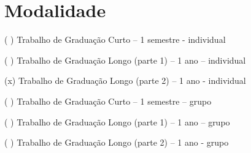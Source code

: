 \chapter{Modalidade}

\begin{description}
	\item (  ) Trabalho de Graduação Curto – 1 semestre - individual
	\item (  ) Trabalho de Graduação Longo (parte 1) – 1 ano – individual
	\item (x) Trabalho de Graduação Longo (parte 2) – 1 ano - individual			
	\item (  ) Trabalho de Graduação Curto – 1 semestre – grupo
	\item (  ) Trabalho de Graduação Longo (parte 1) – 1 ano – grupo
	\item (  ) Trabalho de Graduação Longo (parte 2) – 1 ano - grupo
\end{description}

